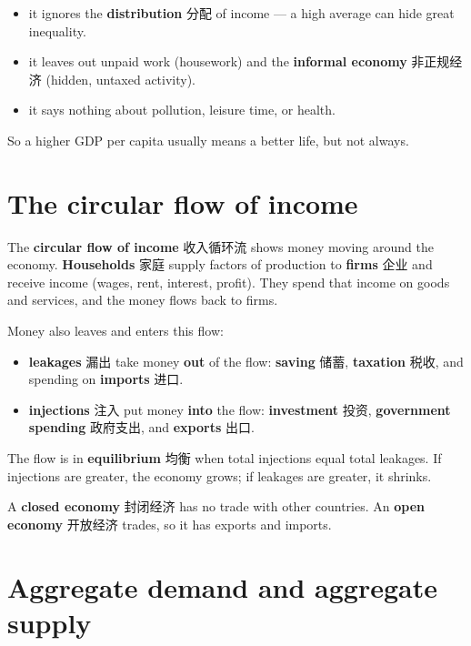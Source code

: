 \documentclass[11pt]{article}
\begin{document}
\begin{itemize}
\item it ignores the \textbf{distribution} 分配 of income — a high average can hide great inequality.

\item it leaves out unpaid work (housework) and the \textbf{informal economy} 非正规经济 (hidden, untaxed activity).

\item it says nothing about pollution, leisure time, or health.

\end{itemize}

So a higher GDP per capita usually means a better life, but not always.

\section*{The circular flow of income}

The \textbf{circular flow of income} 收入循环流 shows money moving around the economy. \textbf{Households} 家庭 supply factors of production to \textbf{firms} 企业 and receive income (wages, rent, interest, profit). They spend that income on goods and services, and the money flows back to firms.

Money also leaves and enters this flow:

\begin{itemize}
\item \textbf{leakages} 漏出 take money \textbf{out} of the flow: \textbf{saving} 储蓄, \textbf{taxation} 税收, and spending on \textbf{imports} 进口.

\item \textbf{injections} 注入 put money \textbf{into} the flow: \textbf{investment} 投资, \textbf{government spending} 政府支出, and \textbf{exports} 出口.

\end{itemize}

The flow is in \textbf{equilibrium} 均衡 when total injections equal total leakages. If injections are greater, the economy grows; if leakages are greater, it shrinks.

A \textbf{closed economy} 封闭经济 has no trade with other countries. An \textbf{open economy} 开放经济 trades, so it has exports and imports.

\section*{Aggregate demand and aggregate supply}
\end{document}
